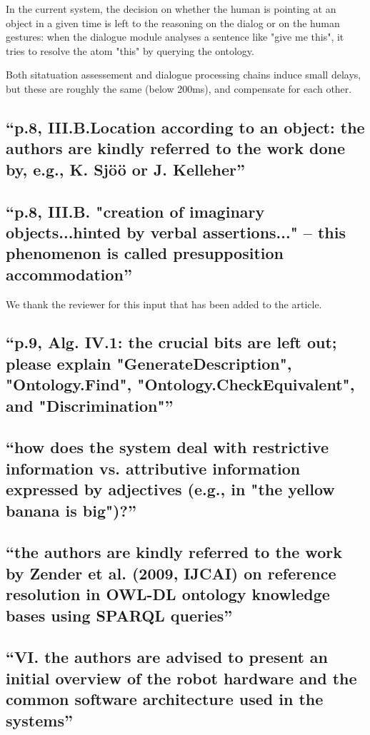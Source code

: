 \documentclass{article}
\begin{document}
In the current system, the decision on whether the human is pointing at an 
object in a given time is left to the reasoning on the dialog or on the human gestures:
when the dialogue module analyses a sentence like "give me this", it tries to
resolve the atom "this" by querying the ontology.

Both sitatuation assessement and dialogue processing chains induce 
small delays, but these are roughly the same (below 200ms), and 
compensate for each other.

\subsection{``p.8, III.B.Location according to an object: the authors are
kindly referred to the work done by, e.g., K. Sjöö or J. Kelleher''}

\subsection{``p.8, III.B. "creation of imaginary objects...hinted by verbal
assertions..." -- this phenomenon is called presupposition accommodation''}

We thank the reviewer for this input that has been added to the article.

\subsection{``p.9, Alg. IV.1: the crucial bits are left out; please explain
"GenerateDescription", "Ontology.Find", "Ontology.CheckEquivalent", and
"Discrimination"''}

\subsection{``how does the system deal with restrictive information vs.
attributive information expressed by adjectives (e.g., in "the yellow banana is
big")?''}

\subsection{``the authors are kindly referred to the work by Zender et al.
(2009, IJCAI) on reference resolution in OWL-DL ontology knowledge bases using
SPARQL queries''}

\subsection{``VI. the authors are advised to present an initial overview of the
robot hardware and the common software architecture used in the systems''}
\end{document}
